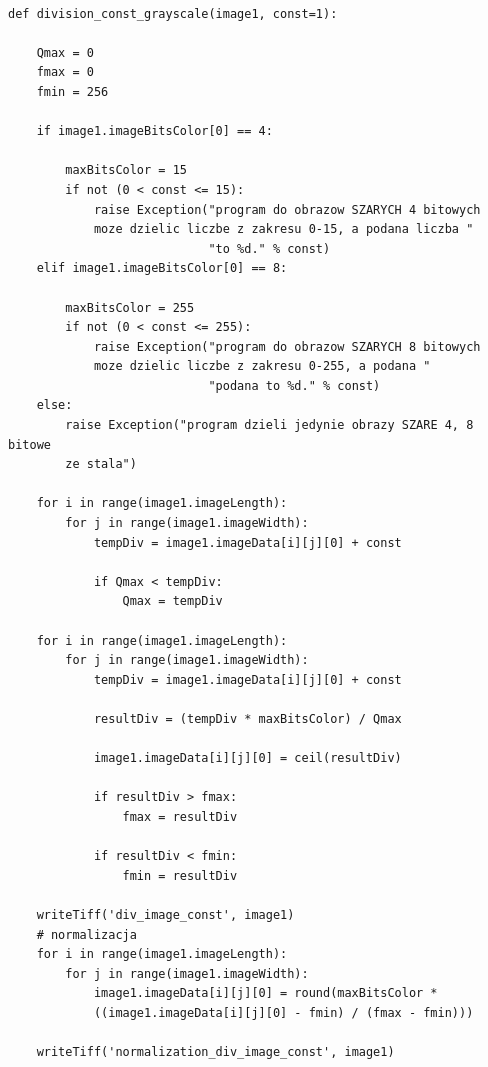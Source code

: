 \documentclass[magisterska,openany]{pracadypl}
\begin{document}
\lstset{language=Python}
\vspace{0.25cm}
\begin{lstlisting}[caption={Dzielnie obrazu przez liczbę}]

def division_const_grayscale(image1, const=1):

    Qmax = 0
    fmax = 0
    fmin = 256

    if image1.imageBitsColor[0] == 4:

        maxBitsColor = 15
        if not (0 < const <= 15):
            raise Exception("program do obrazow SZARYCH 4 bitowych 
            moze dzielic liczbe z zakresu 0-15, a podana liczba "
                            "to %d." % const)
    elif image1.imageBitsColor[0] == 8:

        maxBitsColor = 255
        if not (0 < const <= 255):
            raise Exception("program do obrazow SZARYCH 8 bitowych
            moze dzielic liczbe z zakresu 0-255, a podana "
                            "podana to %d." % const)
    else:
        raise Exception("program dzieli jedynie obrazy SZARE 4, 8 bitowe 
        ze stala")

    for i in range(image1.imageLength):
        for j in range(image1.imageWidth):
            tempDiv = image1.imageData[i][j][0] + const

            if Qmax < tempDiv:
                Qmax = tempDiv

    for i in range(image1.imageLength):
        for j in range(image1.imageWidth):
            tempDiv = image1.imageData[i][j][0] + const

            resultDiv = (tempDiv * maxBitsColor) / Qmax

            image1.imageData[i][j][0] = ceil(resultDiv)

            if resultDiv > fmax:
                fmax = resultDiv

            if resultDiv < fmin:
                fmin = resultDiv

    writeTiff('div_image_const', image1)
    # normalizacja
    for i in range(image1.imageLength):
        for j in range(image1.imageWidth):
            image1.imageData[i][j][0] = round(maxBitsColor * 
            ((image1.imageData[i][j][0] - fmin) / (fmax - fmin)))

    writeTiff('normalization_div_image_const', image1)

\end{lstlisting}
\newpage
\end{document}
